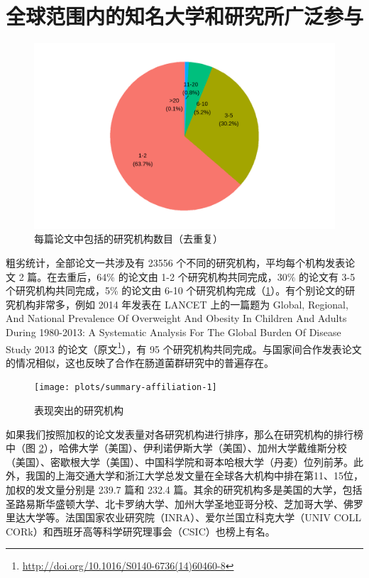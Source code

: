 \documentclass[]{ctexbook}
\renewcommand{\href}[2]{#2\footnote{\url{#1}}}
\begin{document}
\hypertarget{ux5168ux7403ux8303ux56f4ux5185ux7684ux77e5ux540dux5927ux5b66ux548cux7814ux7a76ux6240ux5e7fux6cdbux53c2ux4e0e}{%
\section{全球范围内的知名大学和研究所广泛参与}\label{ux5168ux7403ux8303ux56f4ux5185ux7684ux77e5ux540dux5927ux5b66ux548cux7814ux7a76ux6240ux5e7fux6cdbux53c2ux4e0e}}

\begin{figure}
\includegraphics[width=1\linewidth]{plots/fig-nAFF-1} \caption{每篇论文中包括的研究机构数目（去重复）}\label{fig:fig-nAFF}
\end{figure}

粗劣统计，全部论文一共涉及有 23556 个不同的研究机构，平均每个机构发表论文 2 篇。在去重后，64\% 的论文由 1-2 个研究机构共同完成，30\% 的论文有 3-5 个研究机构共同完成，5\% 的论文由 6-10 个研究机构完成（\ref{fig:fig-nAFF}）。有个别论文的研究机构非常多，例如 2014 年发表在 LANCET 上的一篇题为 Global, Regional, And National Prevalence Of Overweight And Obesity In Children And Adults During 1980-2013: A Systematic Analysis For The Global Burden Of Disease Study 2013 的论文（\href{http://doi.org/10.1016/S0140-6736(14)60460-8}{原文}），有 95 个研究机构共同完成。与国家间合作发表论文的情况相似，这也反映了合作在肠道菌群研究中的普遍存在。

\begin{figure}
\texttt{[image: plots/summary-affiliation-1]} \caption{表现突出的研究机构}\label{fig:summary-affiliation}
\end{figure}

如果我们按照加权的论文发表量对各研究机构进行排序，那么在研究机构的排行榜中（图 \ref{fig:summary-affiliation}），哈佛大学（美国）、伊利诺伊斯大学（美国）、加州大学戴维斯分校（美国）、密歇根大学（美国）、中国科学院和哥本哈根大学（丹麦）位列前茅。此外，我国的上海交通大学和浙江大学总发文量在全球各大机构中排在第11、15位，加权的发文量分别是 239.7 篇和 232.4 篇。其余的研究机构多是美国的大学，包括圣路易斯华盛顿大学、北卡罗纳大学、加州大学圣地亚哥分校、芝加哥大学、佛罗里达大学等。法国国家农业研究院（INRA）、爱尔兰国立科克大学（UNIV COLL CORk）和西班牙高等科学研究理事会（CSIC）也榜上有名。
\end{document}
